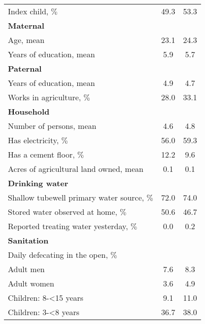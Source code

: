 \documentclass[11pt, nogin]{article}
\begin{document}
\begin{table}[!ht]
\begin{center}
\begin{small}
\begin{tabular}{@{\extracolsep{4pt}}l c c }
 Index child, $\%$ & 49.3 & 53.3 \\ 
  \textbf{Maternal} &  &  \\ 
  \hspace{3mm}Age, mean & 23.1 & 24.3 \\ 
  \hspace{3mm}Years of education, mean & 5.9 & 5.7 \\ 
  \textbf{Paternal} &  &  \\ 
  \hspace{3mm}Years of education, mean & 4.9 & 4.7 \\ 
  \hspace{3mm}Works in agriculture, $\%$ & 28.0 & 33.1 \\ 
  \textbf{Household} &  &  \\ 
  \hspace{3mm}Number of persons, mean & 4.6 & 4.8 \\ 
  \hspace{3mm}Has electricity, $\%$ & 56.0 & 59.3 \\ 
  \hspace{3mm}Has a cement floor, $\%$ & 12.2 & 9.6 \\ 
  \hspace{3mm}Acres of agricultural land owned, mean & 0.1 & 0.1 \\ 
  \textbf{Drinking water} &  &  \\ 
  \hspace{3mm}Shallow tubewell primary water source, $\%$ & 72.0 & 74.0 \\ 
  \hspace{3mm}Stored water observed at home, $\%$ & 50.6 & 46.7 \\ 
  \hspace{3mm}Reported treating water yesterday, $\%$ & 0.0 & 0.2 \\ 
  \textbf{Sanitation} &  &  \\ 
  \hspace{3mm}Daily defecating in the open, $\%$ &  &  \\ 
  \hspace{6mm}Adult men & 7.6 & 8.3 \\ 
  \hspace{6mm}Adult women & 3.6 & 4.9 \\ 
  \hspace{6mm}Children: 8-<15 years & 9.1 & 11.0 \\ 
  \hspace{6mm}Children: 3-<8 years & 36.7 & 38.0 \\ 

\end{tabular}
\end{small}
\end{center}
\end{table}
\end{document}
